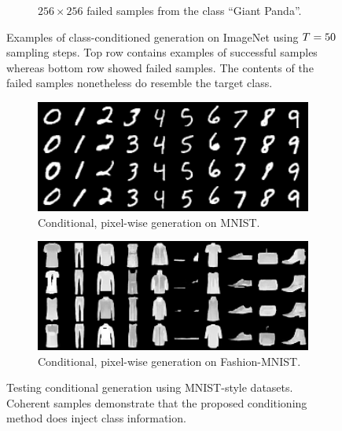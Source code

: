 \begin{figure}[ht]
\begin{subfigure}[b]{0.47\textwidth}
        \caption{
            $256 \times 256$ failed samples from the class ``Giant Panda''.
        }
    \end{subfigure}
    \caption{Examples of class-conditioned generation on ImageNet using
        $T = 50$ sampling steps. Top row contains examples of
    successful samples whereas bottom row showed failed samples. The contents of
    the failed samples nonetheless do resemble the target class.}
    \label{fig:imagenet}
\end{figure}

\begin{figure}[ht]
    \centering
    \begin{subfigure}[b]{0.47\textwidth}
        \centering
        \includegraphics[width=1.0\textwidth]{figures/mnist-samples.png}
        \caption{
            Conditional, pixel-wise generation on MNIST.
        }
    \end{subfigure}
    \hfill
    \begin{subfigure}[b]{0.47\textwidth}
        \centering
        \includegraphics[width=1.0\textwidth]{figures/fashionmnist-samples.png}
        \caption{
            Conditional, pixel-wise generation on Fashion-MNIST.
        }
    \end{subfigure}
    \caption{
        Testing conditional generation using MNIST-style datasets. Coherent
        samples demonstrate that the proposed conditioning method does inject class
        information.
    }
    \label{fig:mnist}
\end{figure}

